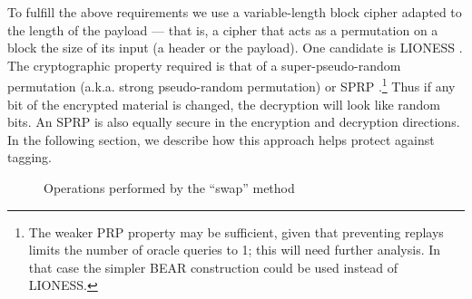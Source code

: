 \documentclass[final]{ieee}
\begin{document}
To fulfill the above requirements we use a variable-length block
cipher adapted to the length of the payload --- that
is, a cipher that acts as a permutation on a block the size of its
input (a header or the payload).  One candidate
is LIONESS \cite{BEAR-LIONESS}.
The cryptographic property required is that of a super-pseudo-random
permutation (a.k.a. strong pseudo-random permutation) or SPRP \cite{sprp}.\footnote{
The weaker PRP property may be sufficient, given that preventing
replays limits the number of oracle queries to 1; this will need
further analysis.  In that case the simpler BEAR construction
\cite{BEAR-LIONESS} could be used instead of LIONESS.}
Thus if any bit of
the encrypted material is changed, the decryption will look like random
bits.  An SPRP is also equally secure in the encryption and decryption
directions.  In the following section, we describe
how this approach helps protect against tagging.


%

\begin{figure}
\begin{center}
\caption{Operations performed by the ``swap'' method} 
\end{center}
\end{figure}
\end{document}
